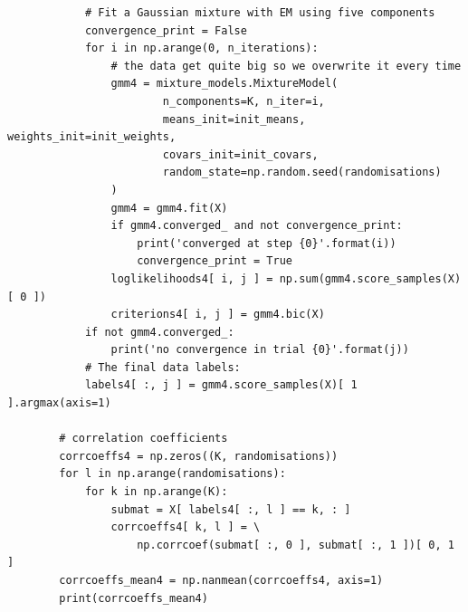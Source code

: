 \begin{verbatim}
            # Fit a Gaussian mixture with EM using five components
            convergence_print = False
            for i in np.arange(0, n_iterations):
                # the data get quite big so we overwrite it every time
                gmm4 = mixture_models.MixtureModel(
                        n_components=K, n_iter=i,
                        means_init=init_means, weights_init=init_weights,
                        covars_init=init_covars,
                        random_state=np.random.seed(randomisations)
                )
                gmm4 = gmm4.fit(X)
                if gmm4.converged_ and not convergence_print:
                    print('converged at step {0}'.format(i))
                    convergence_print = True
                loglikelihoods4[ i, j ] = np.sum(gmm4.score_samples(X)[ 0 ])
                criterions4[ i, j ] = gmm4.bic(X)
            if not gmm4.converged_:
                print('no convergence in trial {0}'.format(j))
            # The final data labels:
            labels4[ :, j ] = gmm4.score_samples(X)[ 1 ].argmax(axis=1)

        # correlation coefficients
        corrcoeffs4 = np.zeros((K, randomisations))
        for l in np.arange(randomisations):
            for k in np.arange(K):
                submat = X[ labels4[ :, l ] == k, : ]
                corrcoeffs4[ k, l ] = \
                    np.corrcoef(submat[ :, 0 ], submat[ :, 1 ])[ 0, 1 ]
        corrcoeffs_mean4 = np.nanmean(corrcoeffs4, axis=1)
        print(corrcoeffs_mean4)


\end{verbatim}
